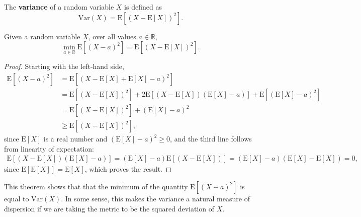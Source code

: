 \documentclass{mldsmsc}
\newcommand{\consta}{a}
\newcommand{\X}{X}
\newcommand{\EE}[1]{ \mathrm{E} [ #1 ] }
\newcommand{\inparenth}[1]{\left( #1 \right)}
\begin{document}
\begin{definition}
    The \textbf{variance} of a random variable $X$ is defined as
    \begin{equation}
        \mathrm{Var}(X) = \mathrm{E}[(X - \mathrm{E}[X])^2].
    \end{equation}
\end{definition}

\begin{theorem}
    \label{thm:theorem1}
Given a random variable $X$, over all values $a \in \mathbb{R}$, 
\begin{equation}
    \min_{a \in \mathbb{R}} \mathrm{E}[(X - a)^2] 
    = \mathrm{E}[(X - \mathrm{E}[X])^2].
    \label{eqn:second}
\end{equation}
\end{theorem}

\begin{proof}   
    Starting with the left-hand side,
\begin{align}
\EE{ \inparenth{\X - \consta}^2 } 
&=  \EE{  \inparenth{\X - \EE{\X} + \EE{\X} - \consta}^2 } 
    \nonumber \\
&=  \EE{  \inparenth{ \X - \EE{\X} }^2 } 
    + 2 \EE{ \inparenth{ \X - \EE{\X} } \inparenth{ \EE{\X} - \consta} } +  
  \EE{ \inparenth{ \EE{\X} - \consta}^2  }    
    \nonumber \\
&=  \EE{  \inparenth{ \X - \EE{\X} }^2 } +  \inparenth{ \EE{\X} - \consta}^2
    \nonumber \\
& \geq \EE{  \inparenth{ \X - \EE{\X} }^2 },  
\nonumber 
\end{align}
since $\EE{\X}$ is a real number and $\inparenth{ \EE{\X} - \consta}^2 \geq 0$,
and the third line follows from linearity of expectation:
\begin{align}
    \EE{ \inparenth{ \X - \EE{\X} } \inparenth{ \EE{\X} - \consta} }
    =
    \inparenth{ \EE{\X} - \consta} \EE{ \inparenth{ \X - \EE{\X} } }
    =
    \inparenth{ \EE{\X} - \consta}  \inparenth{\EE{ \X} - \EE{\X} } 
    =
    0,
    \nonumber
\end{align}
    since $\EE{\EE{\X}} = \EE{\X}$, which proves the result.
\end{proof}

\begin{remark}
    This theorem shows that that the minimum of the quantity
    $\mathrm{E}[(X - a)^2]$ is equal to $\mathrm{Var}(X)$.
    In some sense, this makes the variance a natural measure of dispersion if 
    we are taking the metric to be the squared deviation of $X$.
\end{remark}
\end{document}
